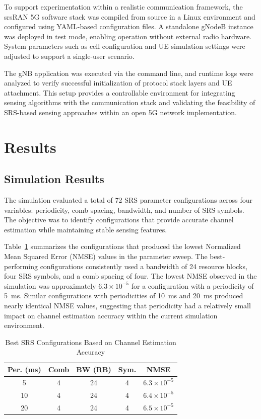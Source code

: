\documentclass[conference]{IEEEtran}
\begin{document}
To support experimentation within a realistic communication framework, the srsRAN 5G software stack was compiled from source in a Linux environment and configured using YAML-based configuration files. A standalone gNodeB \cite{open5gs_site} instance was deployed in test mode, enabling operation without external radio hardware. System parameters such as cell configuration and UE simulation settings were adjusted to support a single-user scenario.

The gNB application was executed via the command line, and runtime logs were analyzed to verify successful initialization of protocol stack layers and UE attachment. This setup provides a controllable environment for integrating sensing algorithms with the communication stack and validating the feasibility of SRS-based sensing approaches within an open 5G network implementation.

\section{Results}

\subsection{Simulation Results}

The simulation evaluated a total of 72 SRS parameter configurations across four variables: periodicity, comb spacing, bandwidth, and number of SRS symbols. The objective was to identify configurations that provide accurate channel estimation while maintaining stable sensing features.

Table~\ref{table:srs_results} summarizes the configurations that produced the lowest Normalized Mean Squared Error (NMSE) values in the parameter sweep. The best-performing configurations consistently used a bandwidth of 24 resource blocks, four SRS symbols, and a comb spacing of four. The lowest NMSE observed in the simulation was approximately $6.3 \times 10^{-5}$ for a configuration with a periodicity of 5~ms. Similar configurations with periodicities of 10~ms and 20~ms produced nearly identical NMSE values, suggesting that periodicity had a relatively small impact on channel estimation accuracy within the current simulation environment.

\begin{table}[htbp]
\caption{Best SRS Configurations Based on Channel Estimation Accuracy}
\centering
\renewcommand{\arraystretch}{1.2}
\setlength{\tabcolsep}{5pt}

\begin{tabular}{ccccc}
\toprule
\textbf{Per. (ms)} & \textbf{Comb} & \textbf{BW (RB)} & \textbf{Sym.} & \textbf{NMSE} \\
\midrule
5  & 4 & 24 & 4 & $6.3\times10^{-5}$ \\
10 & 4 & 24 & 4 & $6.4\times10^{-5}$ \\
20 & 4 & 24 & 4 & $6.5\times10^{-5}$ \\
\bottomrule
\end{tabular}

\label{table:srs_results}
\end{table}
\end{document}
